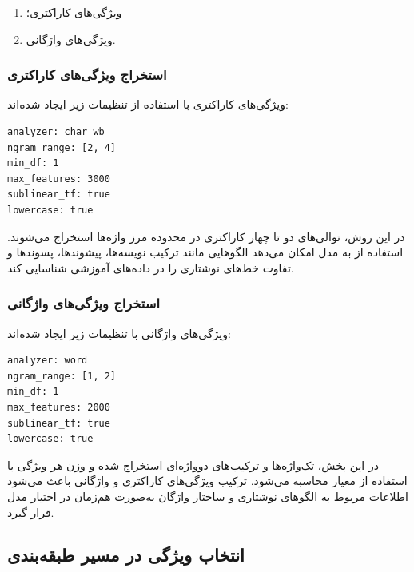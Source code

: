 \documentclass[12pt,a4paper,oneside]{report}
\begin{document}
\begin{enumerate}
	\item ویژگی‌های کاراکتری؛
	\item ویژگی‌های واژگانی.
\end{enumerate}


\subsubsection{استخراج ویژگی‌های کاراکتری}

ویژگی‌های کاراکتری با استفاده از تنظیمات زیر ایجاد شده‌اند:

\begin{latin}
\begin{verbatim}
analyzer: char_wb
ngram_range: [2, 4]
min_df: 1
max_features: 3000
sublinear_tf: true
lowercase: true
\end{verbatim}
\end{latin}

در این روش، توالی‌های دو تا چهار کاراکتری در محدوده مرز واژه‌ها استخراج می‌شوند. استفاده از
به مدل امکان می‌دهد الگوهایی مانند ترکیب نویسه‌ها، پیشوندها، پسوندها و تفاوت خط‌های نوشتاری را در داده‌های آموزشی شناسایی کند.


\subsubsection{استخراج ویژگی‌های واژگانی}

ویژگی‌های واژگانی با تنظیمات زیر ایجاد شده‌اند:

\begin{latin}
\begin{verbatim}
analyzer: word
ngram_range: [1, 2]
min_df: 1
max_features: 2000
sublinear_tf: true
lowercase: true
\end{verbatim}
\end{latin}

در این بخش، تک‌واژه‌ها و ترکیب‌های دوواژه‌ای استخراج شده و وزن هر ویژگی با استفاده از معیار
محاسبه می‌شود. ترکیب ویژگی‌های کاراکتری و واژگانی باعث می‌شود اطلاعات مربوط به الگوهای نوشتاری و ساختار واژگان به‌صورت هم‌زمان در اختیار مدل قرار گیرد.


\subsection{انتخاب ویژگی در مسیر طبقه‌بندی}
\end{document}
